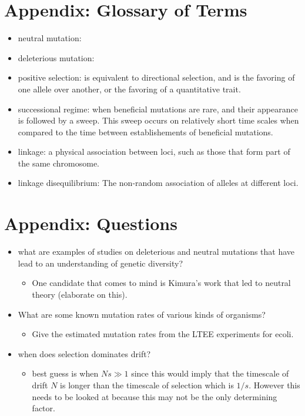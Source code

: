 \documentclass[12pt,twocolumn]{article}
\begin{document}
\section*{Appendix: Glossary of Terms}
\begin{itemize}
\item neutral mutation:
\item deleterious mutation:
\item positive selection: is equivalent to directional selection, and is the favoring of one allele over another, or the favoring of a quantitative trait.
\item successional regime: when beneficial mutations are rare, and their appearance is followed by a sweep.  This sweep occurs on relatively short time scales when compared to the time between establishements of beneficial mutations.
\item linkage: a physical association between loci, such as those that form part of the same chromosome.
\item linkage disequilibrium:  The non-random association of alleles at different loci.
\end{itemize}

\section*{Appendix: Questions}
\begin{itemize}
\item what are examples of studies on deleterious and neutral mutations that have lead to an understanding of genetic diversity?
	\begin{itemize}
	\item One candidate that comes to mind is Kimura's work that led to neutral theory (elaborate on this).
	\end{itemize}
\item What are some known mutation rates of various kinds of organisms?
	\begin{itemize}
	\item Give the estimated mutation rates from the LTEE experiments for ecoli.
	\end{itemize}
\item when does selection dominates drift?
	\begin{itemize}
	\item best guess is when $Ns \gg 1$ since this would imply that the timescale of drift $N$ is longer than the timescale of selection which is $1/s$.  However this needs to be looked at because this may not be the only determining factor.
	\end{itemize}
\end{itemize}


\end{document}
